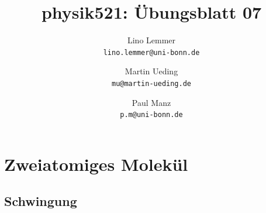 

\setcounter{section}{0}
\renewcommand\thesection{H\,7.\arabic{section}}
\renewcommand\thesubsection{\thesection.\alph{subsection}}

\title{physik521: Übungsblatt 07}
\author{%
    Lino Lemmer \\ \small{\texttt{lino.lemmer@uni-bonn.de}}
    \and
    Martin Ueding \\ \small{\texttt{mu@martin-ueding.de}}
    \and
    Paul Manz \\ \small{\texttt{p.m@uni-bonn.de}}
}


\maketitle
\section{Zweiatomiges Molekül}

\subsection{Schwingung}

